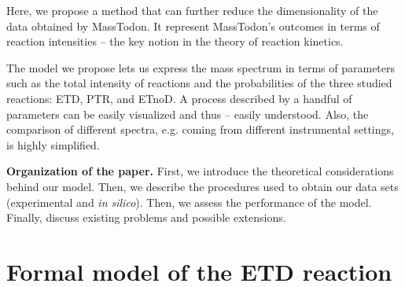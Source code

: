 \documentclass{llncs}
\begin{document}
Here, we propose a method that can further reduce the dimensionality of the data obtained by {\sc MassTodon}.
It represent {\sc MassTodon}'s outcomes in terms of reaction intensities -- the key notion in the theory of reaction kinetics.

The model we propose lets us express the mass spectrum in terms of parameters such as the total intensity of reactions and the probabilities of the three studied reactions: ETD, PTR, and ETnoD. A process described by a handful of parameters can be easily visualized and thus -- easily understood. Also, the comparison of different spectra, e.g. coming from different instrumental settings, is highly simplified.

\textbf{Organization of the paper.}
First, we introduce the theoretical considerations behind our model. Then, we describe the procedures used to obtain our data sets (experimental and \textit{in silico}). Then, we assess the performance of the model. Finally, discuss existing problems and possible extensions.


\section{Formal model of the ETD reaction}
\end{document}
